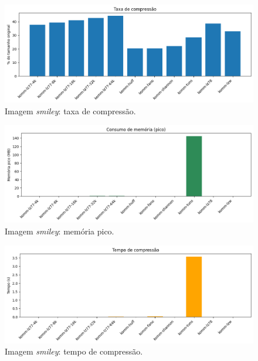 \begin{figure}[h]
  \centering
  \caption{Imagem \textit{smiley}: taxa de compressão.}
  \label{fig:komm-smiley-compression}
  \includegraphics[width=15cm]{figuras/komm_smiley_compression.png}
\end{figure}

\begin{figure}[ht]
  \centering
  \caption{Imagem \textit{smiley}: memória pico.}
  \label{fig:komm-smiley-memory}
  \includegraphics[width=15cm]{figuras/komm_smiley_memory.png}
\end{figure}

\begin{figure}[ht]
  \centering
  \caption{Imagem \textit{smiley}: tempo de compressão.}
  \label{fig:komm-smiley-time}
  \includegraphics[width=15cm]{figuras/komm_smiley_time.png}
\end{figure}


